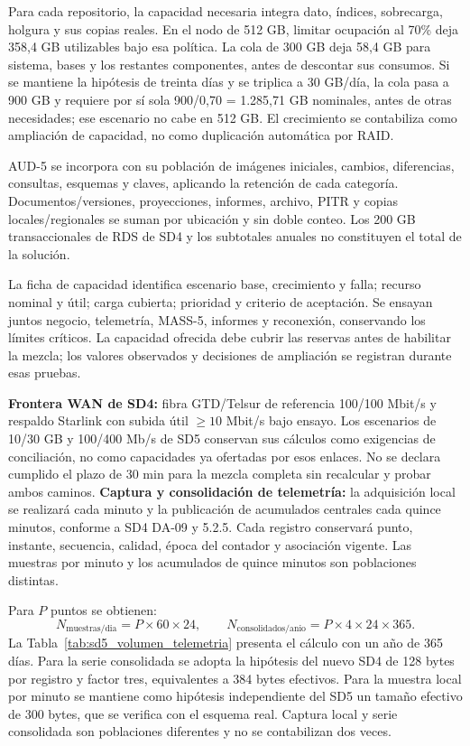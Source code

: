 Para cada repositorio, la capacidad necesaria integra dato, índices, sobrecarga, holgura y sus copias reales. En el nodo de 512 GB, limitar ocupación al 70\% deja 358,4 GB utilizables bajo esa política. La cola de 300 GB deja 58,4 GB para sistema, bases y los restantes componentes, antes de descontar sus consumos. Si se mantiene la hipótesis de treinta días y se triplica a 30 GB/día, la cola pasa a 900 GB y requiere por sí sola 900/0,70 = 1.285,71 GB nominales, antes de otras necesidades; ese escenario no cabe en 512 GB. El crecimiento se contabiliza como ampliación de capacidad, no como duplicación automática por RAID.

AUD-5 se incorpora con su población de imágenes iniciales, cambios, diferencias, consultas, esquemas y claves, aplicando la retención de cada categoría. Documentos/versiones, proyecciones, informes, archivo, PITR y copias locales/regionales se suman por ubicación y sin doble conteo. Los 200 GB transaccionales de RDS de SD4 y los subtotales anuales no constituyen el total de la solución.

La ficha de capacidad identifica escenario base, crecimiento y falla; recurso nominal y útil; carga cubierta; prioridad y criterio de aceptación. Se ensayan juntos negocio, telemetría, MASS-5, informes y reconexión, conservando los límites críticos. La capacidad ofrecida debe cubrir las reservas antes de habilitar la mezcla; los valores observados y decisiones de ampliación se registran durante esas pruebas.

\textbf{Frontera WAN de SD4:} fibra GTD/Telsur de referencia 100/100 Mbit/s y respaldo Starlink con subida útil $\ge10$ Mbit/s bajo ensayo. Los escenarios de 10/30 GB y 100/400 Mb/s de SD5 conservan sus cálculos como exigencias de conciliación, no como capacidades ya ofertadas por esos enlaces. No se declara cumplido el plazo de 30 min para la mezcla completa sin recalcular y probar ambos caminos. \textbf{Captura y consolidación de telemetría:} la adquisición local se realizará cada minuto y la publicación de acumulados centrales cada quince minutos, conforme a SD4 DA-09 y 5.2.5. Cada registro conservará punto, instante, secuencia, calidad, época del contador y asociación vigente. Las muestras por minuto y los acumulados de quince minutos son poblaciones distintas.

Para \(P\) puntos se obtienen:
\[
N_{\mathrm{muestras/dia}}=P\times60\times24,\qquad
N_{\mathrm{consolidados/anio}}=P\times4\times24\times365.
\]
La Tabla~\ref{tab:sd5_volumen_telemetria} presenta el cálculo con un año de 365 días. Para la serie consolidada se adopta la hipótesis del nuevo SD4 de 128 bytes por registro y factor tres, equivalentes a 384 bytes efectivos. Para la muestra local por minuto se mantiene como hipótesis independiente del SD5 un tamaño efectivo de 300 bytes, que se verifica con el esquema real. Captura local y serie consolidada son poblaciones diferentes y no se contabilizan dos veces.

